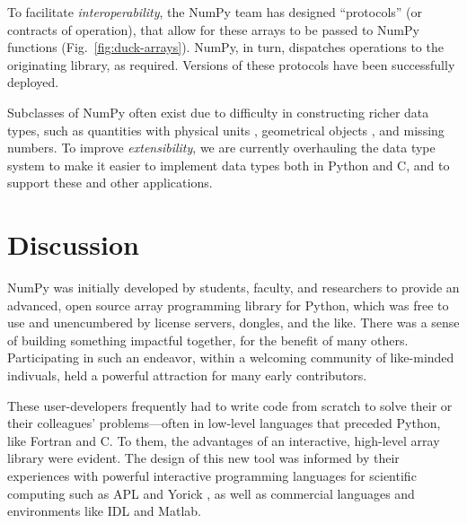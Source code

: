 To facilitate \emph{interoperability}, the NumPy team has designed
``protocols'' (or contracts of operation), that allow for these arrays to be
passed to NumPy functions (Fig.~\ref{fig:duck-arrays}).
NumPy, in turn, dispatches operations to the originating library, as required.
Versions of these protocols have been successfully deployed.


Subclasses of NumPy often exist due to difficulty in constructing richer data
types, such as quantities with physical units \cite{astropy,Goldbaum2018,pint},
geometrical objects \cite{pygeos}, and missing numbers.
To improve \emph{extensibility}, we are currently overhauling the data type
system to make it easier to implement data types both in Python and C, and to
support these and other applications.

\section*{Discussion}

NumPy was initially developed by students, faculty, and researchers to
provide an advanced, open source array programming library for Python,
which was free to use and unencumbered by license servers, dongles, and the like.
There was a sense of building something
impactful together, for the benefit of many others.  Participating in
such an endeavor, within a welcoming community of like-minded
indivuals, held a powerful attraction for many early contributors.

These user-developers frequently had to write code from scratch to solve
their or their colleagues' problems---often in low-level languages
that preceded Python, like Fortran \cite{dongarra2008netlib} and C.
To them, the advantages of an interactive, high-level array library
were evident. The design of this new tool was informed by their
experiences with powerful interactive programming languages for
scientific computing such as APL \cite{iverson1962programming} and
Yorick \cite{munro1995using}, as well as commercial languages and
environments like IDL and Matlab.

